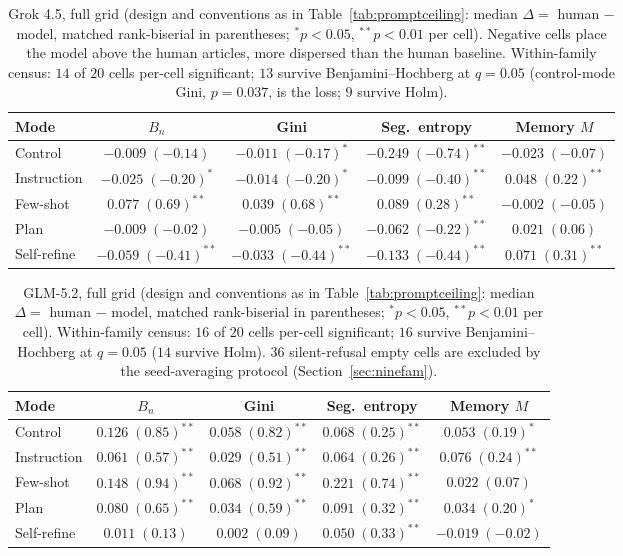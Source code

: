 \documentclass{article}
\begin{document}
\begin{table}[htbp]
\centering
\small
\caption{Grok 4.5, full grid (design and conventions as in Table~\ref{tab:promptceiling}: median $\Delta =$ human $-$ model, matched rank-biserial in parentheses; $^{*}p<0.05$, $^{**}p<0.01$ per cell). Negative cells place the model above the human articles, more dispersed than the human baseline. Within-family census: $14$ of $20$ cells per-cell significant; $13$ survive Benjamini--Hochberg at $q=0.05$ (control-mode Gini, $p=0.037$, is the loss; $9$ survive Holm).}
\label{tab:grid-grok-45}
\begin{tabular}{lcccc}
\toprule
Mode & $B_n$ & Gini & Seg.\ entropy & Memory $M$ \\
\midrule
Control & $-0.009\;(-0.14)$ & $-0.011\;(-0.17)^{*}$ & $-0.249\;(-0.74)^{**}$ & $-0.023\;(-0.07)$ \\
Instruction & $-0.025\;(-0.20)^{*}$ & $-0.014\;(-0.20)^{*}$ & $-0.099\;(-0.40)^{**}$ & $0.048\;(0.22)^{**}$ \\
Few-shot & $0.077\;(0.69)^{**}$ & $0.039\;(0.68)^{**}$ & $0.089\;(0.28)^{**}$ & $-0.002\;(-0.05)$ \\
Plan & $-0.009\;(-0.02)$ & $-0.005\;(-0.05)$ & $-0.062\;(-0.22)^{**}$ & $0.021\;(0.06)$ \\
Self-refine & $-0.059\;(-0.41)^{**}$ & $-0.033\;(-0.44)^{**}$ & $-0.133\;(-0.44)^{**}$ & $0.071\;(0.31)^{**}$ \\
\bottomrule
\end{tabular}
\end{table}

\begin{table}[htbp]
\centering
\small
\caption{GLM-5.2, full grid (design and conventions as in Table~\ref{tab:promptceiling}: median $\Delta =$ human $-$ model, matched rank-biserial in parentheses; $^{*}p<0.05$, $^{**}p<0.01$ per cell). Within-family census: $16$ of $20$ cells per-cell significant; $16$ survive Benjamini--Hochberg at $q=0.05$ ($14$ survive Holm). 36 silent-refusal empty cells are excluded by the seed-averaging protocol (Section~\ref{sec:ninefam}).}
\label{tab:grid-glm-52}
\begin{tabular}{lcccc}
\toprule
Mode & $B_n$ & Gini & Seg.\ entropy & Memory $M$ \\
\midrule
Control & $0.126\;(0.85)^{**}$ & $0.058\;(0.82)^{**}$ & $0.068\;(0.25)^{**}$ & $0.053\;(0.19)^{*}$ \\
Instruction & $0.061\;(0.57)^{**}$ & $0.029\;(0.51)^{**}$ & $0.064\;(0.26)^{**}$ & $0.076\;(0.24)^{**}$ \\
Few-shot & $0.148\;(0.94)^{**}$ & $0.068\;(0.92)^{**}$ & $0.221\;(0.74)^{**}$ & $0.022\;(0.07)$ \\
Plan & $0.080\;(0.65)^{**}$ & $0.034\;(0.59)^{**}$ & $0.091\;(0.32)^{**}$ & $0.034\;(0.20)^{*}$ \\
Self-refine & $0.011\;(0.13)$ & $0.002\;(0.09)$ & $0.050\;(0.33)^{**}$ & $-0.019\;(-0.02)$ \\
\bottomrule
\end{tabular}
\end{table}
\end{document}
